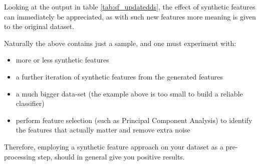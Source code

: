 \begin{table}[ht]
    \centering
    \selectfont
    \caption{Updated sample of the four rows from the Psy dataset from the YouTube comment training dataset now containing the synthetic features.}
    \label{tab:sf_updatedds}
\end{table}
\vspace{2mm}

Looking at the output in table \ref{tab:sf_updatedds}, the effect of synthetic features can immediately be appreciated, as with such new features more meaning is given to the original dataset.

Naturally the above contains just a sample, and one must experiment with:

\begin{itemize}
    \item more or less synthetic features
    \item a further iteration of synthetic features from the generated features
    \item a much bigger data-set (the example above is too small to build a reliable classifier)
    \item perform feature selection (such as Principal Component Analysis) to identify the features that actually matter and remove extra noise
\end{itemize}

Therefore, employing a synthetic feature approach on your dataset as a pre-processing step, should in general give you positive results.

